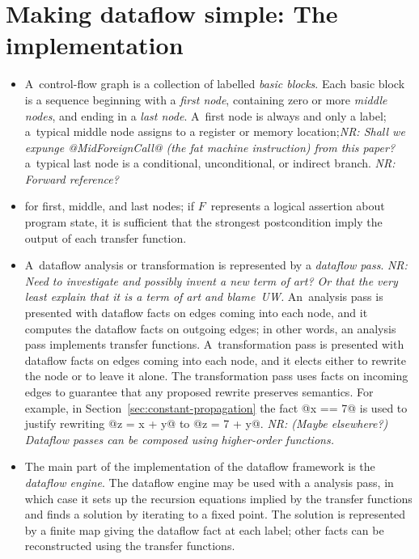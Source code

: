 \documentclass[blockstyle,preprint,nocopyrightspace]{sigplanconf}
\newcommand{\authornote}[1]{{\em #1}}
\newcommand{\norman}[1]{\authornote{NR: #1}}
\let\remark\norman
\newcommand\secref[1]{Section~\ref{sec:#1}}
\newcommand\seclabel[1]{\label{sec:#1}}
\begin{document}
\section{Making dataflow simple: The  implementation}

\seclabel{analysis-interface}

\begin{itemize} 
\item
A~control-flow graph is a collection of labelled \emph{basic blocks}.
Each basic block is a sequence beginning with a \emph{first node},
containing zero or more \emph{middle nodes},
and ending in a \emph{last node}.
A~first node is always and only a label;
a~typical middle node assigns to a register or memory
location;\remark
{Shall we expunge @MidForeignCall@ (the fat machine instruction) from
this paper?}
a~typical last node is a conditional, unconditional, or indirect branch.
\remark{Forward reference?}

\item
 for first, middle, and last nodes;
if $F$~represents a logical assertion about program state, it is
sufficient that the strongest postcondition imply the output of each
transfer function.
\item
A~dataflow analysis or transformation is represented by a
\emph{dataflow pass}.
\remark{Need to investigate and possibly invent a new term of art?
Or that the very least explain that it \emph{is} a term of art and
blame~UW.} 
%
An~analysis pass is presented with dataflow facts on edges coming
into each node, and it computes the dataflow facts on outgoing edges;
in other words, an analysis pass implements transfer functions.
A~transformation pass is presented with dataflow facts on edges coming
into each node, and it elects either to rewrite the node or to leave
it alone.
The transformation pass uses facts on incoming edges to guarantee that
any proposed rewrite
preserves semantics.
For example, in \secref{constant-propagation} the fact @x == 7@ is
used to justify rewriting @z = x + y@ to @z = 7 + y@.
%
\remark{(Maybe elsewhere?) Dataflow passes can be composed using
higher-order functions. }
\item
The main part of the implementation of the dataflow framework is the
\emph{dataflow engine}.
The dataflow engine may be used with a analysis pass,
in which case it sets up the recursion equations implied by the
transfer functions and finds a solution by iterating to a fixed point.
The solution is represented by a finite map giving the dataflow fact
at each label; other facts can be reconstructed using the transfer functions.


\end{itemize}
\end{document}
